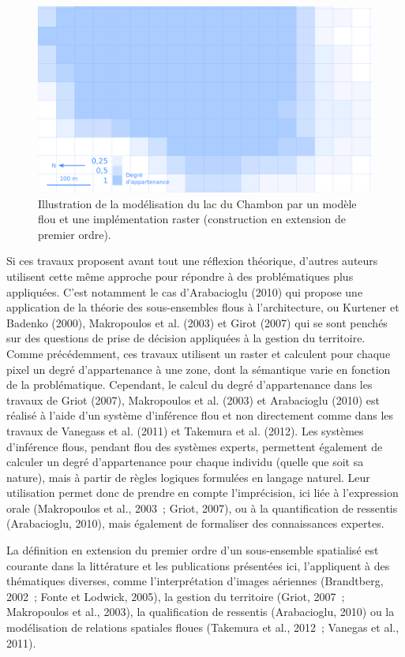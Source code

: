 \begin{figure}
  \centering
  \includegraphics{../figures/fig11.png}
  \caption{Illustration de la modélisation du lac du Chambon par un
    modèle flou et une implémentation raster (\ie construction en
    extension de premier ordre).}
  \label{fig:champ_raster}
\end{figure}

Si ces travaux proposent avant tout une réflexion théorique, d’autres
auteurs utilisent cette même approche pour répondre à des
problématiques plus appliquées. C’est notamment le cas d’Arabacioglu
(2010) qui propose une application de la théorie des sous-ensembles
flous à l’architecture, ou Kurtener et Badenko (2000), Makropoulos et
al. (2003) et Girot (2007) qui se sont penchés sur des questions de
prise de décision appliquées à la gestion du territoire. Comme
précédemment, ces travaux utilisent un raster et calculent pour chaque
pixel un degré d’appartenance à une zone, dont la sémantique varie en
fonction de la problématique. Cependant, le calcul du degré
d’appartenance dans les travaux de Griot (2007), Makropoulos et
al. (2003) et Arabacioglu (2010) est réalisé à l’aide d’un système
d’inférence flou et non directement comme dans les travaux de Vanegass
et al. (2011) et Takemura et al. (2012). Les systèmes d’inférence
flous, pendant flou des systèmes experts,  permettent également de
calculer un degré d’appartenance pour chaque individu (quelle que soit
sa nature), mais à partir de règles logiques formulées en langage
naturel.  Leur utilisation permet donc de prendre en compte
l’imprécision, ici liée à l’expression orale (Makropoulos et al.,
2003 ; Griot, 2007), ou à la quantification de ressentis (Arabacioglu,
2010), mais également de formaliser des connaissances expertes.

La définition en extension du premier ordre d’un sous-ensemble
spatialisé est courante dans la littérature et les publications
présentées ici, l’appliquent à des thématiques diverses, comme
l’interprétation d’images aériennes (Brandtberg, 2002 ; Fonte et
Lodwick, 2005), la gestion du territoire (Griot, 2007 ; Makropoulos et
al., 2003), la qualification de ressentis (Arabacioglu, 2010) ou la
modélisation de relations spatiales floues (Takemura et al., 2012 ;
Vanegas et al., 2011).

